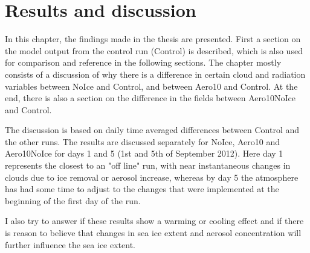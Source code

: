 \chapter{Results and discussion}
\label{chap:results}
In this chapter, the findings made in the thesis are presented. First a section on the model output from the control run (Control) is described, which is also used for comparison and reference in the following sections. The chapter mostly consists of a discussion of why there is a difference in certain cloud and radiation variables between NoIce and Control, and between Aero10 and Control. At the end, there is also a section on the difference in the fields between Aero10NoIce and Control.

The discussion is based on daily time averaged differences between Control and the other runs. The results are discussed separately for NoIce, Aero10 and Aero10NoIce for days 1 and 5 (1st and 5th of September 2012). Here day 1 represents the closest to an "off line" run, with near instantaneous changes in clouds due to ice removal or aerosol increase, whereas by day 5 the atmosphere has had some time to adjust to the changes that were implemented at the beginning of the first day of the run.

I also try to answer if these results show a warming or cooling effect and if there is reason to believe that changes in sea ice extent and aerosol concentration will further influence the sea ice extent.

